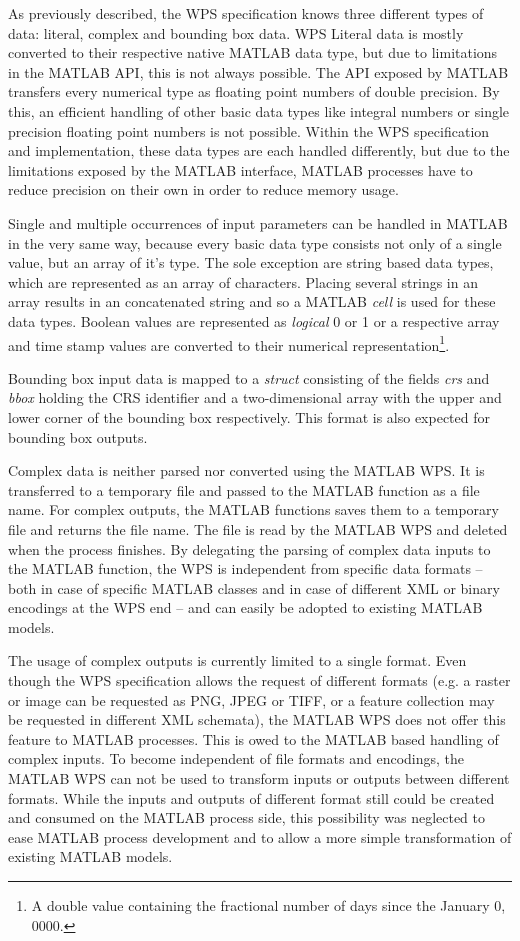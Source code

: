     As previously described, the \acl{WPS} specification knows three different types of data: literal, complex and bounding box data.
    \ac{WPS} Literal data is mostly converted to their respective native MATLAB data type, but due to limitations in the MATLAB \ac{API}, this is not always possible. The \ac{API} exposed by MATLAB transfers every numerical type as floating point numbers of double precision. By this, an efficient handling of other basic data types like integral numbers or single precision floating point numbers is not possible. Within the WPS specification and implementation, these data types are each handled differently, but due to the limitations exposed by the MATLAB interface, MATLAB processes have to reduce precision on their own in order to reduce memory usage.

    Single and multiple occurrences of input parameters can be handled in MATLAB in the very same way, because every basic data type consists not only of a single value, but an array of it's type. The sole exception are string based data types, which are represented as an array of characters. Placing several strings in an array results in an concatenated string and so a MATLAB \emph{cell} is used for these data types. Boolean values are represented as \emph{logical} 0 or 1 or a respective array and time stamp values are converted to their numerical representation\footnote{A double value containing the fractional number of days since the January 0, 0000.}.

    Bounding box input data is mapped to a \emph{struct} consisting of the fields \emph{crs} and \emph{bbox} holding the \ac{CRS} identifier and a two-dimensional array with the upper and lower corner of the bounding box respectively. This format is also expected for bounding box outputs.

    Complex data is neither parsed nor converted using the MATLAB WPS. It is transferred to a temporary file and passed to the MATLAB function as a file name. For complex outputs, the MATLAB functions saves them to a temporary file and returns the file name. The file is read by the MATLAB WPS and deleted when the process finishes. By delegating the parsing of complex data inputs to the MATLAB function, the WPS is independent from specific data formats -- both in case of specific MATLAB classes and in case of different XML or binary encodings at the WPS end -- and can easily be adopted to existing MATLAB models.

    The usage of complex outputs is currently limited to a single format. Even though the WPS specification allows the request of different formats (e.g. a raster or image can be requested as PNG, JPEG or TIFF, or a feature collection may be requested in different XML schemata), the MATLAB WPS does not offer this feature to MATLAB processes. This is owed to the MATLAB based handling of complex inputs. To become independent of file formats and encodings, the MATLAB WPS can not be used to transform inputs or outputs between different formats. While the inputs and outputs of different format still could be created and consumed on the MATLAB process side, this possibility was neglected to ease MATLAB process development and to allow a more simple transformation of existing MATLAB models.

